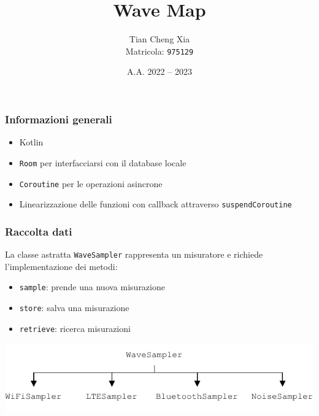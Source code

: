 \documentclass{beamer}
\begin{document}
\title{Wave Map}
\author{Tian Cheng Xia\\{\footnotesize Matricola: \texttt{975129}}}
\date{A.A. 2022 -- 2023}


\begin{frame}
    \titlepage
\end{frame}


\begin{frame}
    \frametitle{Informazioni generali}

    \begin{itemize}
        \item Kotlin
        \item \texttt{Room} per interfacciarsi con il database locale
        \item \texttt{Coroutine} per le operazioni asincrone
        \item Linearizzazione delle funzioni con callback attraverso \texttt{suspendCoroutine}
    \end{itemize}
\end{frame}


\begin{frame}
    \frametitle{Raccolta dati}

    La classe astratta \texttt{WaveSampler} rappresenta un misuratore e richiede l'implementazione dei metodi:
    \begin{itemize}
        \item \texttt{sample}: prende una nuova misurazione
        \item \texttt{store}: salva una misurazione
        \item \texttt{retrieve}: ricerca misurazioni
    \end{itemize}

    \includegraphics[width=\linewidth]{./img/sampler.pdf}
\end{frame}
\end{document}
